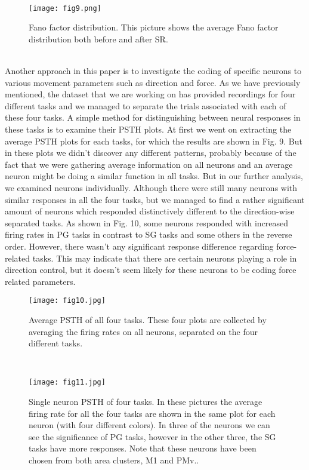 \documentclass[9pt,twocolumn]{paper-template}
\begin{document}
\\
\begin{figure}%
\centering
\texttt{[image: fig9.png]}
\caption{Fano factor distribution. This picture shows the average Fano factor distribution both before and after SR.}
\label{fig:frog}
\end{figure}
\\
Another approach in this paper is to investigate the coding of specific neurons to various movement parameters such as direction and force. As we have previously mentioned, the dataset that we are working on has provided recordings for four different tasks and we managed to separate the trials associated with each of these four tasks. A simple method for distinguishing between neural responses in these tasks is to examine their PSTH plots. At first we went on extracting the average PSTH plots for each tasks, for which the results are shown in Fig. 9. But in these plots we didn’t discover any different patterns, probably because of the fact that we were gathering average information on all neurons and an average neuron might be doing a similar function in all tasks. But in our further analysis, we examined neurons individually. Although there were still many neurons with similar responses in all the four tasks, but we managed to find a rather significant amount of neurons which responded distinctively different to the direction-wise separated tasks. As shown in Fig. 10, some neurons responded with increased firing rates in PG tasks in contrast to SG tasks and some others in the reverse order. However, there wasn’t any significant response difference regarding force-related tasks. This may indicate that there are certain neurons playing a role in direction control, but it doesn’t seem likely for these neurons to be coding force related parameters.\\
\begin{figure}%
\centering
\texttt{[image: fig10.jpg]}
\caption{Average PSTH of all four tasks. These four plots are collected by averaging the firing rates on all neurons, separated on the four different tasks.}
\label{fig:frog}
\end{figure}
\\
\begin{SCfigure*}[\sidecaptionrelwidth][t]
\centering
\texttt{[image: fig11.jpg]}
\caption{Single neuron PSTH of four tasks. In these pictures the average firing rate for all the four tasks are shown in the same plot for each neuron (with four different colors). In three of the neurons we can see the significance of PG tasks, however in the other three, the SG tasks have more responses. Note that these neurons have been chosen from both area clusters, M1 and PMv..}\label{fig:side}
\end{SCfigure*}
\end{document}
